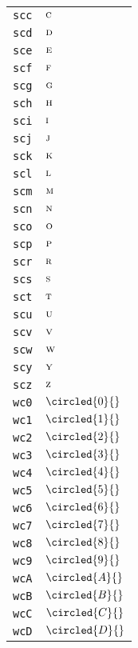 \begin{longtable}{ll}
\texttt{scc}&${}{\textsc{c}}{}$\\
\texttt{scd}&${}{\textsc{d}}{}$\\
\texttt{sce}&${}{\textsc{e}}{}$\\
\texttt{scf}&${}{\textsc{f}}{}$\\
\texttt{scg}&${}{\textsc{g}}{}$\\
\texttt{sch}&${}{\textsc{h}}{}$\\
\texttt{sci}&${}{\textsc{i}}{}$\\
\texttt{scj}&${}{\textsc{j}}{}$\\
\texttt{sck}&${}{\textsc{k}}{}$\\
\texttt{scl}&${}{\textsc{l}}{}$\\
\texttt{scm}&${}{\textsc{m}}{}$\\
\texttt{scn}&${}{\textsc{n}}{}$\\
\texttt{sco}&${}{\textsc{o}}{}$\\
\texttt{scp}&${}{\textsc{p}}{}$\\
\texttt{scr}&${}{\textsc{r}}{}$\\
\texttt{scs}&${}{\textsc{s}}{}$\\
\texttt{sct}&${}{\textsc{t}}{}$\\
\texttt{scu}&${}{\textsc{u}}{}$\\
\texttt{scv}&${}{\textsc{v}}{}$\\
\texttt{scw}&${}{\textsc{w}}{}$\\
\texttt{scy}&${}{\textsc{y}}{}$\\
\texttt{scz}&${}{\textsc{z}}{}$\\
\texttt{wc0}&${}\circled{0}{}$\\
\texttt{wc1}&${}\circled{1}{}$\\
\texttt{wc2}&${}\circled{2}{}$\\
\texttt{wc3}&${}\circled{3}{}$\\
\texttt{wc4}&${}\circled{4}{}$\\
\texttt{wc5}&${}\circled{5}{}$\\
\texttt{wc6}&${}\circled{6}{}$\\
\texttt{wc7}&${}\circled{7}{}$\\
\texttt{wc8}&${}\circled{8}{}$\\
\texttt{wc9}&${}\circled{9}{}$\\
\texttt{wcA}&${}\circled{A}{}$\\
\texttt{wcB}&${}\circled{B}{}$\\
\texttt{wcC}&${}\circled{C}{}$\\
\texttt{wcD}&${}\circled{D}{}$\\

\end{longtable}
